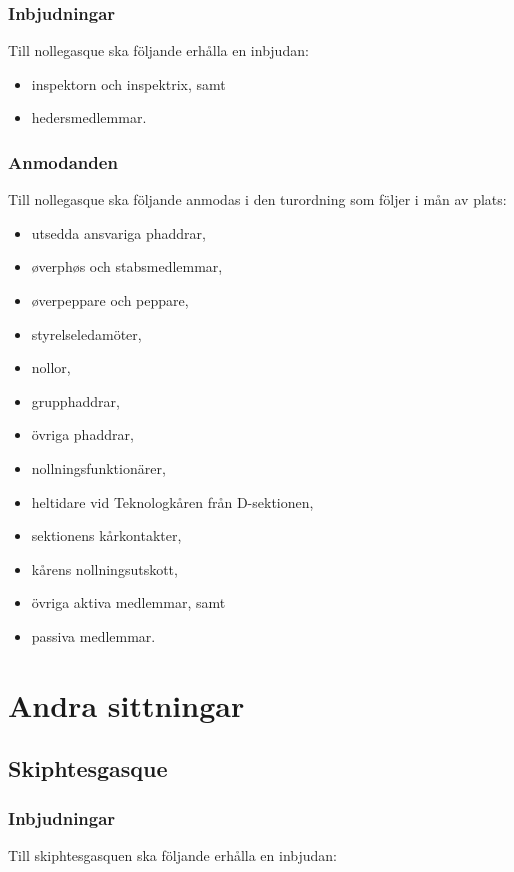 \documentclass{dsekprotokoll}
\begin{document}
\subsubsection{Inbjudningar}
Till nollegasque ska följande erhålla en inbjudan:
\begin{itemize}
    \item inspektorn och inspektrix, samt
    \item hedersmedlemmar.
\end{itemize}

\subsubsection{Anmodanden}
Till nollegasque ska följande anmodas i den turordning som
följer i mån av plats:
  \begin{itemize}
    \item utsedda ansvariga phaddrar,
    \item øverphøs och stabsmedlemmar,
    \item øverpeppare och peppare,
    \item styrelseledamöter,
    \item nollor,
    \item grupphaddrar,
    \item övriga phaddrar,
    \item nollningsfunktionärer,
    \item heltidare vid Teknologkåren från D-sektionen,
    \item sektionens kårkontakter,
    \item kårens nollningsutskott,
    \item övriga aktiva medlemmar, samt
    \item passiva medlemmar.
  \end{itemize}



\section{Andra sittningar}

\subsection{Skiphtesgasque}

\subsubsection{Inbjudningar}
Till skiphtesgasquen ska följande erhålla en inbjudan:
\end{document}
